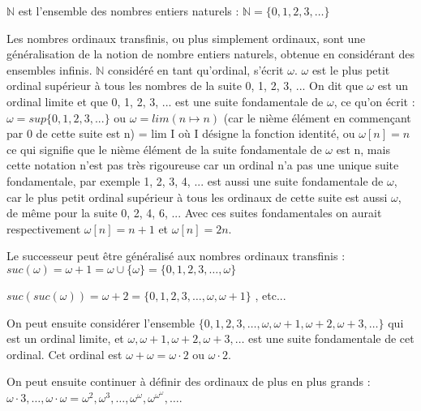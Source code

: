 \documentclass[12pt]{beamer}
\begin{document}
\begin{frame}

\small

\( \mathbb{N} \) est l'ensemble des nombres entiers naturels : \( \mathbb{N} = \lbrace0,1,2,3,\ldots\rbrace \)

Les nombres ordinaux transfinis, ou plus simplement ordinaux, sont une généralisation de la notion de nombre entiers naturels, obtenue en considérant des ensembles infinis. \( \mathbb{N} \) considéré en tant qu'ordinal, s'écrit \( \omega \).
\( \omega \) est le plus petit ordinal supérieur à tous les nombres de la suite 0, 1, 2, 3, ... On dit que \( \omega \) est un ordinal limite et que 0, 1, 2, 3, ... est une suite fondamentale de \( \omega \), ce qu'on écrit : \( \omega = sup \lbrace 0, 1, 2, 3, ... \rbrace \) ou \( \omega = lim ( n \mapsto n ) \) (car le nième élément en commençant par 0 de cette suite est n) = lim I où I désigne la fonction identité, ou \( \omega[n] = n \) ce qui signifie que le nième élément de la suite fondamentale de $\omega$ est n, mais cette notation n'est pas très rigoureuse car un ordinal n'a pas une unique suite fondamentale, par exemple 1, 2, 3, 4, ... est aussi une suite fondamentale de \( \omega \), car le plus petit ordinal supérieur à tous les ordinaux de cette suite est aussi \( \omega \), de même pour la suite  0, 2, 4, 6, ... Avec ces suites fondamentales on aurait respectivement \( \omega[n] = n+1 \) et \( \omega[n] = 2n \).

\end{frame}
\begin{frame}

Le successeur peut être généralisé aux nombres ordinaux transfinis  : \( suc(\omega) = \omega+1 =\omega \cup \lbrace \omega \rbrace = \lbrace 0, 1, 2, 3, \ldots, \omega \rbrace \)

\( suc(suc(\omega)) = \omega+2 = \lbrace 0, 1, 2, 3, \ldots, \omega, \omega+1 \rbrace \) , etc...

On peut ensuite considérer l'ensemble \( \lbrace 0, 1, 2, 3, \ldots, \omega, \omega+1, \omega+2, \omega+3, \ldots \rbrace \) qui est un ordinal limite, et \( \omega, \omega+1, \omega+2, \omega+3, \ldots \) est une suite fondamentale de cet ordinal. Cet ordinal est \( \omega+\omega = \omega \cdot 2 \) ou \( \omega \cdot 2 \).

On peut ensuite continuer à définir des ordinaux de plus en plus grands :  \( \omega \cdot 3, \ldots, \omega \cdot \omega = \omega^2, \omega^3, \ldots, \omega^\omega, \omega^{\omega^\omega}, \ldots \).

\end{frame}
\end{document}
